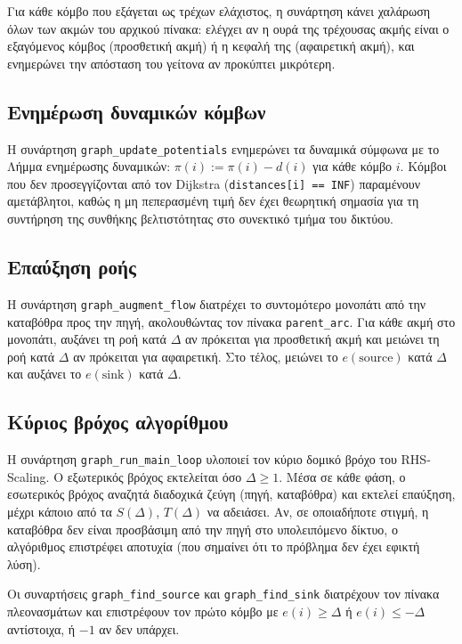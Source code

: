 \documentclass[11pt,a4paper,oneside]{report}
\let\oldsubsection\subsection
\renewcommand{\subsection}{\FloatBarrier\oldsubsection}
\begin{document}
Για κάθε κόμβο που εξάγεται ως τρέχων ελάχιστος, η συνάρτηση κάνει χαλάρωση όλων των ακμών του αρχικού πίνακα: ελέγχει αν η ουρά της τρέχουσας ακμής είναι ο εξαγόμενος κόμβος (προσθετική ακμή) ή η κεφαλή της (αφαιρετική ακμή), και ενημερώνει την απόσταση του γείτονα αν προκύπτει μικρότερη.

\subsection{Ενημέρωση δυναμικών κόμβων}

Η συνάρτηση \texttt{graph\_update\_potentials} ενημερώνει τα δυναμικά σύμφωνα με το Λήμμα ενημέρωσης δυναμικών: $\pi(i) := \pi(i) - d(i)$ για κάθε κόμβο $i$. Κόμβοι που δεν προσεγγίζονται από τον \textenglish{Dijkstra} (\texttt{distances[i] == INF}) παραμένουν αμετάβλητοι, καθώς η μη πεπερασμένη τιμή δεν έχει θεωρητική σημασία για τη συντήρηση της συνθήκης βελτιστότητας στο συνεκτικό τμήμα του δικτύου.

\subsection{Επαύξηση ροής}

Η συνάρτηση \texttt{graph\_augment\_flow} διατρέχει το συντομότερο μονοπάτι από την καταβόθρα προς την πηγή, ακολουθώντας τον πίνακα \texttt{parent\_arc}. Για κάθε ακμή στο μονοπάτι, αυξάνει τη ροή κατά $\Delta$ αν πρόκειται για προσθετική ακμή και μειώνει τη ροή κατά $\Delta$ αν πρόκειται για αφαιρετική. Στο τέλος, μειώνει το $e(\text{source})$ κατά $\Delta$ και αυξάνει το $e(\text{sink})$ κατά $\Delta$.

\subsection{Κύριος βρόχος αλγορίθμου}

Η συνάρτηση \texttt{graph\_run\_main\_loop} υλοποιεί τον κύριο δομικό βρόχο του \textenglish{RHS-Scaling}. Ο εξωτερικός βρόχος εκτελείται όσο $\Delta \geq 1$. Μέσα σε κάθε φάση, ο εσωτερικός βρόχος αναζητά διαδοχικά ζεύγη (πηγή, καταβόθρα) και εκτελεί επαύξηση, μέχρι κάποιο από τα $S(\Delta)$, $T(\Delta)$ να αδειάσει. Αν, σε οποιαδήποτε στιγμή, η καταβόθρα δεν είναι προσβάσιμη από την πηγή στο υπολειπόμενο δίκτυο, ο αλγόριθμος επιστρέφει αποτυχία (που σημαίνει ότι το πρόβλημα δεν έχει εφικτή λύση).

Οι συναρτήσεις \texttt{graph\_find\_source} και \texttt{graph\_find\_sink} διατρέχουν τον πίνακα πλεονασμάτων και επιστρέφουν τον πρώτο κόμβο με $e(i) \geq \Delta$ ή $e(i) \leq -\Delta$ αντίστοιχα, ή $-1$ αν δεν υπάρχει.
\end{document}
